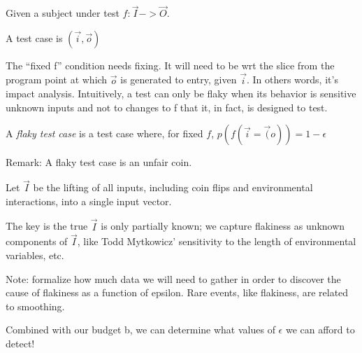 \begin{defn}
	Given a subject under test $f: \vec{I} -> \vec{O}$.

	A test case is $(\vec{i},\vec{o})$

	The “fixed f” condition needs fixing.  It will need to be wrt the slice from the program point at which $\vec{o}$ is generated to entry, given $\vec{i}$. In others words, it’s impact analysis.  Intuitively, a test can only be flaky when its behavior is sensitive unknown inputs and not to changes to f that it, in fact, is designed to test.

	A \emph{flaky test case} is a test case where, for fixed $f$,
	$p(f(\vec{i} = \vec(o)) = 1 - \epsilon$

	Remark: A flaky test case is an unfair coin.

	Let $\vec{I}$ be the lifting of all inputs, including coin flips and environmental interactions, into a single input vector.

	The key is the true $\vec{I}$ is only partially known;  we capture flakiness as unknown components of $\vec{I}$, like Todd Mytkowicz’ sensitivity to the length of environmental variables, etc.

	Note:  formalize how much data we will need to gather in order to discover the cause of flakiness as a function of epsilon.  Rare events, like flakiness, are related to smoothing.

	Combined with our budget b, we can determine what values of $\epsilon$ we can afford to detect!
\end{defn}



